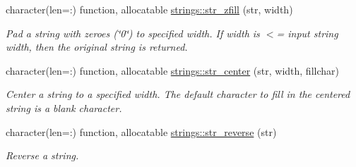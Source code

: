 \begin{DoxyCompactItemize}
character(len=\+:) function, allocatable \mbox{\hyperlink{namespacestrings_af7c5fa6249abe3060899aab8ce88686e}{strings\+::str\+\_\+zfill}} (str, width)
\begin{DoxyCompactList}\small\item\em Pad a string with zeroes (\char`\"{}0\char`\"{}) to specified width. If width is $<$= input string width, then the original string is returned. \end{DoxyCompactList}\item 
character(len=\+:) function, allocatable \mbox{\hyperlink{namespacestrings_a4200b0c5200b64c2c2a6ce8862e2af58}{strings\+::str\+\_\+center}} (str, width, fillchar)
\begin{DoxyCompactList}\small\item\em Center a string to a specified width. The default character to fill in the centered string is a blank character. \end{DoxyCompactList}\item 
character(len=\+:) function, allocatable \mbox{\hyperlink{namespacestrings_a71f27e53beff6353ceead343b10761ec}{strings\+::str\+\_\+reverse}} (str)
\begin{DoxyCompactList}\small\item\em Reverse a string. \end{DoxyCompactList}\end{DoxyCompactItemize}
